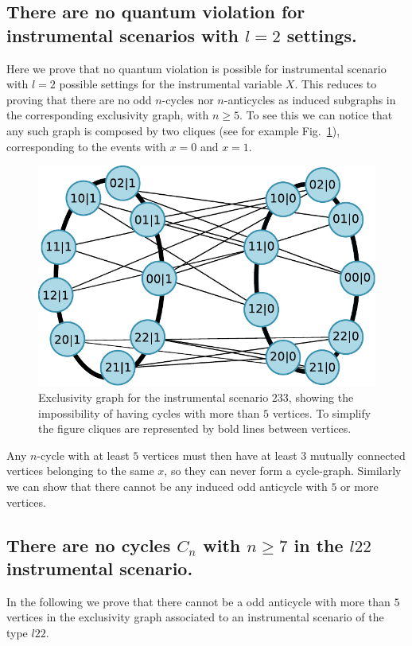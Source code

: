 \documentclass[letterpaper]{article}
\begin{document}
\subsection*{There are no quantum violation for instrumental scenarios with $l=2$
settings.}
Here we prove that no quantum violation is possible for instrumental scenario
with $l=2$ possible settings for the instrumental variable $X$.
This reduces to proving that there are no odd $n$-cycles nor $n$-anticycles as induced
subgraphs in the corresponding exclusivity graph, with $n\ge5$.
To see this we can notice that any such graph is composed by two cliques (see
for example Fig.~\ref{fig:2mn_nocycle_proof}), corresponding to the events with $x=0$ and
$x=1$.
\begin{figure}[t]
    \centering
    \includegraphics[width=.7\columnwidth]{images/nocycles_proof.pdf}
    \caption{Exclusivity graph for the instrumental scenario $233$, showing the
        impossibility of having cycles with more than $5$ vertices. To simplify the figure cliques are
    represented by bold lines between vertices.}
    \label{fig:2mn_nocycle_proof}
\end{figure}
Any $n$-cycle with at least $5$ vertices must then have at least $3$ mutually
connected vertices belonging to the same $x$, so they can never form a
cycle-graph.
Similarly we can show that there cannot be any induced odd anticycle with $5$ or more
vertices.

\subsection*{There are no cycles $C_n$ with $n \ge 7$ in the $l22$ instrumental scenario.}
In the following we prove that there cannot be a odd anticycle with more than
$5$ vertices in the exclusivity graph associated to an instrumental scenario of
the type $l22$.
\end{document}
